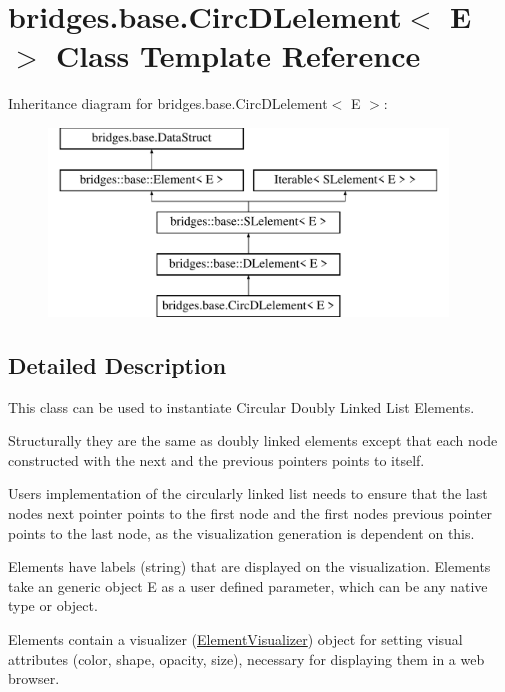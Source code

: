 \hypertarget{classbridges_1_1base_1_1_circ_d_lelement}{}\section{bridges.\+base.\+Circ\+D\+Lelement$<$ E $>$ Class Template Reference}
\label{classbridges_1_1base_1_1_circ_d_lelement}
Inheritance diagram for bridges.\+base.\+Circ\+D\+Lelement$<$ E $>$\+:\begin{figure}[H]
\begin{center}
\leavevmode
\includegraphics[height=5.000000cm]{classbridges_1_1base_1_1_circ_d_lelement}
\end{center}
\end{figure}


\subsection{Detailed Description}
This class can be used to instantiate Circular Doubly Linked List Elements. 

Structurally they are the same as doubly linked elements except that each node constructed with the next and the previous pointers points to itself.

User\textquotesingle{}s implementation of the circularly linked list needs to ensure that the last node\textquotesingle{}s next pointer points to the first node and the first node\textquotesingle{}s previous pointer points to the last node, as the visualization generation is dependent on this.

Elements have labels (string) that are displayed on the visualization. Elements take an generic object E as a user defined parameter, which can be any native type or object.

Elements contain a visualizer (\mbox{\hyperlink{classbridges_1_1base_1_1_element_visualizer}{Element\+Visualizer}}) object for setting visual attributes (color, shape, opacity, size), necessary for displaying them in a web browser.

